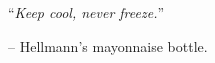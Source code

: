 \chapter*{}
\vspace*{0.2\textheight}
\begin{center}
\noindent\enquote{\itshape Keep cool, never freeze.}\hspace{1.5cm} \bigbreak

\hspace{1.5cm} -- Hellmann's\textsuperscript{\textregistered} mayonnaise bottle.
\end{center}
